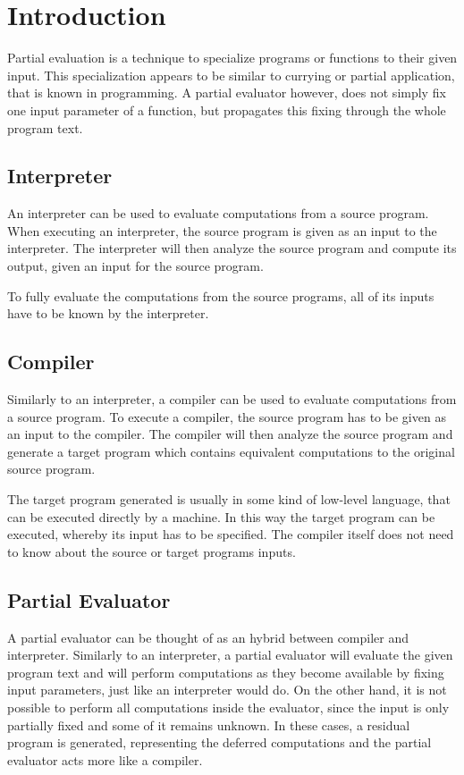 
\section{Introduction}\label{sec:introduction}

Partial evaluation is a technique to specialize programs or functions to their given input.
This specialization appears to be similar to currying or partial application, that is known in programming.
A partial evaluator however, does not simply fix one input parameter of a function, but propagates this fixing through the whole program text.

\subsection{Interpreter}

An interpreter can be used to evaluate computations from a source program.
When executing an interpreter, the source program is given as an input to the interpreter.
The interpreter will then analyze the source program and compute its output, given an input for the source program.

To fully evaluate the computations from the source programs, all of its inputs have to be known by the interpreter.


\subsection{Compiler}

Similarly to an interpreter, a compiler can be used to evaluate computations from a source program.
To execute a compiler, the source program has to be given as an input to the compiler.
The compiler will then analyze the source program and generate a target program which contains equivalent computations to the original source program.

The target program generated is usually in some kind of low-level language, that can be executed directly by a machine.
In this way the target program can be executed, whereby its input has to be specified.
The compiler itself does not need to know about the source or target programs inputs.


\subsection{Partial Evaluator}

A partial evaluator can be thought of as an hybrid between compiler and interpreter.
Similarly to an interpreter, a partial evaluator will evaluate the given program text and will perform computations as they become available by fixing input parameters, just like an interpreter would do.
On the other hand, it is not possible to perform all computations inside the evaluator, since the input is only partially fixed and some of it remains unknown.
In these cases, a residual program is generated, representing the deferred computations and the partial evaluator acts more like a compiler.

